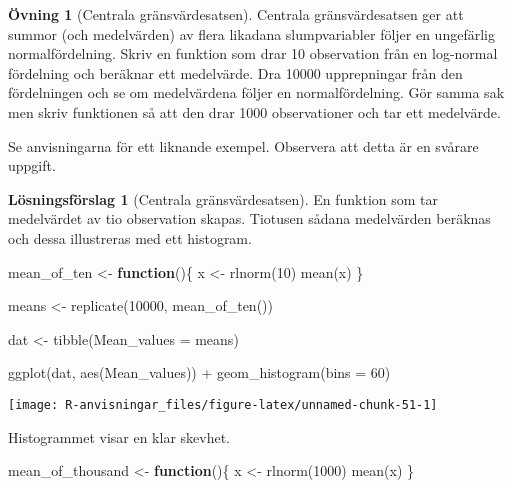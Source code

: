 \documentclass[
]{book}
\newenvironment{Shaded}{\begin{snugshade}}{\end{snugshade}}
\newcommand{\AttributeTok}[1]{\textcolor[rgb]{0.77,0.63,0.00}{#1}}
\newcommand{\ControlFlowTok}[1]{\textcolor[rgb]{0.13,0.29,0.53}{\textbf{#1}}}
\newcommand{\DecValTok}[1]{\textcolor[rgb]{0.00,0.00,0.81}{#1}}
\newcommand{\FunctionTok}[1]{\textcolor[rgb]{0.00,0.00,0.00}{#1}}
\newcommand{\NormalTok}[1]{#1}
\newcommand{\OtherTok}[1]{\textcolor[rgb]{0.56,0.35,0.01}{#1}}
\newcommand{\SpecialCharTok}[1]{\textcolor[rgb]{0.00,0.00,0.00}{#1}}
\theoremstyle{definition}
\theoremstyle{definition}
\theoremstyle{definition}
\newtheorem{exercise}{Övning}[chapter]
\theoremstyle{definition}
\newtheorem{hypothesis}{Lösningsförslag}[chapter]
\theoremstyle{remark}
\begin{document}
\begin{exercise}[Centrala gränsvärdesatsen]
Centrala gränsvärdesatsen ger att summor (och medelvärden) av flera likadana slumpvariabler följer en ungefärlig normalfördelning. Skriv en funktion som drar 10 observation från en log-normal fördelning och beräknar ett medelvärde. Dra 10000 upprepningar från den fördelningen och se om medelvärdena följer en normalfördelning. Gör samma sak men skriv funktionen så att den drar 1000 observationer och tar ett medelvärde.

Se anvisningarna för ett liknande exempel. Observera att detta är en svårare uppgift.
\end{exercise}

\begin{hypothesis}[Centrala gränsvärdesatsen]
En funktion som tar medelvärdet av tio observation skapas. Tiotusen sådana medelvärden beräknas och dessa illustreras med ett histogram.

\begin{Shaded}
\begin{Highlighting}[]
\NormalTok{mean\_of\_ten }\OtherTok{\textless{}{-}} \ControlFlowTok{function}\NormalTok{()\{}
\NormalTok{  x }\OtherTok{\textless{}{-}} \FunctionTok{rlnorm}\NormalTok{(}\DecValTok{10}\NormalTok{)}
  \FunctionTok{mean}\NormalTok{(x)}
\NormalTok{\}}

\NormalTok{means }\OtherTok{\textless{}{-}} \FunctionTok{replicate}\NormalTok{(}\DecValTok{10000}\NormalTok{, }\FunctionTok{mean\_of\_ten}\NormalTok{())}

\NormalTok{dat }\OtherTok{\textless{}{-}} \FunctionTok{tibble}\NormalTok{(}\AttributeTok{Mean\_values =}\NormalTok{ means)}

\FunctionTok{ggplot}\NormalTok{(dat, }\FunctionTok{aes}\NormalTok{(Mean\_values)) }\SpecialCharTok{+}
  \FunctionTok{geom\_histogram}\NormalTok{(}\AttributeTok{bins =} \DecValTok{60}\NormalTok{)}
\end{Highlighting}
\end{Shaded}

\begin{center}\texttt{[image: R-anvisningar\_files/figure-latex/unnamed-chunk-51-1]} \end{center}

Histogrammet visar en klar skevhet.

\begin{Shaded}
\begin{Highlighting}[]
\NormalTok{mean\_of\_thousand }\OtherTok{\textless{}{-}} \ControlFlowTok{function}\NormalTok{()\{}
\NormalTok{  x }\OtherTok{\textless{}{-}} \FunctionTok{rlnorm}\NormalTok{(}\DecValTok{1000}\NormalTok{)}
  \FunctionTok{mean}\NormalTok{(x)}
\NormalTok{\}}


\end{Highlighting}
\end{Shaded}
\end{hypothesis}
\end{document}

